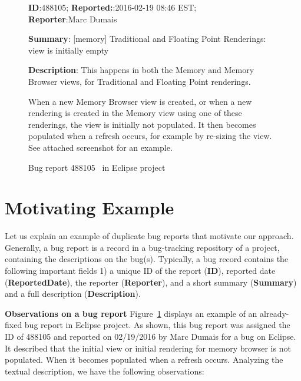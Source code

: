 



\begin{figure}[t]
\sf
\small
\textbf{ID}:488105; \textbf{Reported:}:2016-02-19 08:46 EST; \\\textbf{Reporter}:Marc Dumais

\textbf{Summary}:  [memory] Traditional and Floating Point Renderings: view is initially empty

\textbf{Description}: This happens in both the Memory and Memory Browser views, for Traditional and Floating Point renderings. 

When a new Memory Browser view is created, or when a new rendering is created in the Memory view using one of these renderings, the view is initially not populated. It then becomes populated when a refresh occurs, for example by re-sizing the view. See attached screenshot for an example.
\rm
\caption{Bug report 488105~\cite{bug488105} in Eclipse project}
\label{fig:br1}
\end{figure}


\section{Motivating Example}
\label{sec:example}

Let us explain an example of duplicate bug reports that motivate our
approach. Generally, a bug report is a record in a bug-tracking
repository of a project, containing the descriptions on the
bug(s). Typically, a bug record contains the following important
fields 1) a unique ID of the report (\textbf{\sf ID}), reported date
(\textbf{\sf ReportedDate}), the reporter (\textbf{\sf Reporter}), and
a short summary (\textbf{\sf Summary}) and a full description
(\textbf{\sf Description}).

\vspace{0.05in}\noindent\textbf{Observations on a bug report}
Figure~\ref{fig:br1} displays an example of an already-fixed bug
report in Eclipse project. As shown, this bug report was assigned the
ID of 488105 and reported on 02/19/2016 by Marc Dumais for a bug on
Eclipse. It described that the initial view or initial rendering for
memory browser is not populated. When it becomes populated when a
refresh occurs. Analyzing the textual description, we have the
following observations:

